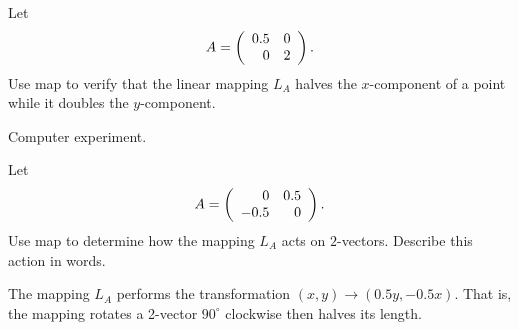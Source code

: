 \documentclass{ximera}
\begin{document}
\CEXER

\begin{exercise} \label{c4.3.13}
Let
\[
A = \left(\begin{array}{rr} 0.5 & 0\\ 0 &2\end{array}\right).
\]
Use {\sf map} to verify that the linear mapping $L_A$ halves
the $x$-component of a point while it doubles the $y$-component.

\begin{solution}
Computer experiment.

\end{solution}
\end{exercise}

\begin{exercise} \label{c4.3.14}
Let
\[
A = \left(\begin{array}{rr} 0 & 0.5\\ -0.5 &0\end{array}\right).
\]
Use {\sf map} to determine how the mapping $L_A$ acts on $2$-vectors.
Describe this action in words.

\begin{solution}

The mapping $L_A$ performs the transformation $(x,y) \rightarrow
(0.5y, -0.5x)$.  That is, the mapping rotates a 2-vector
$90^\circ$ clockwise then halves its length.

\end{solution}
\end{exercise}
\end{document}
